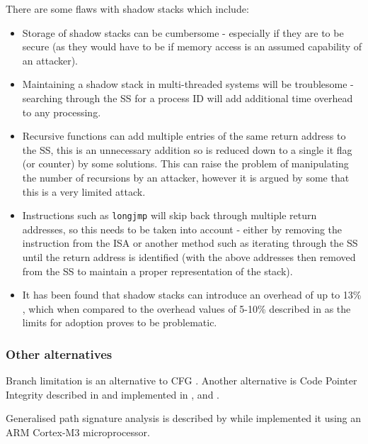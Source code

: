 There are some flaws with shadow stacks which include:
\begin{itemize}
	\item Storage of shadow stacks can be cumbersome - especially if they are to be secure (as they would have to be if memory access is an assumed capability of an attacker).
	\item Maintaining a shadow stack in multi-threaded systems will be troublesome - searching through the SS for a process ID will add additional time overhead to any processing.
	\item Recursive functions can add multiple entries of the same return address to the SS, this is an unnecessary addition so is reduced down to a single it flag (or counter) by some solutions. This can raise the problem of manipulating the number of recursions by an attacker, however it is argued by some that this is a very limited attack.
	\item Instructions such as \verb|longjmp| will skip back through multiple return addresses, so this needs to be taken into account - either by removing the instruction from the ISA or another method such as iterating through the SS until the return address is identified (with the above addresses then removed from the SS to maintain a proper representation of the stack).
	\item It has been found that shadow stacks can introduce an overhead of up to 13\% \cite{Dang}, which when compared to the overhead values of 5-10\% described in \cite{Szekeres2013} as the limits for adoption proves to be problematic.
\end{itemize}

\subsubsection{Other alternatives}

Branch limitation is an alternative to CFG \cite{He2017} \cite{Corporation2017}.
Another alternative is Code Pointer Integrity described in \cite{Security2017} and implemented in \cite{Kuznetsov:204783},\cite{Mashtizadeh2014} and \cite{Szekeres2013}.

Generalised path signature analysis is described by \cite{Mahmood1988} while \cite{Werner2016} implemented it using an ARM Cortex-M3 microprocessor.